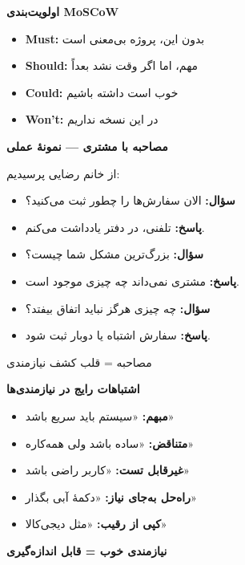 \documentclass[14pt, a4paper, landscape]{extarticle}
\newcommand{\slide}[1]{%
    \newpage
    \begin{center}
    \begin{minipage}[t]{0.95\textwidth}
    \vspace{0.5cm}
    #1
    \vspace{0.5cm}
    \end{minipage}
    \end{center}
}
\newcommand{\slidetitle}[1]{%
    \begin{center}
        {\LARGE\bfseries\textcolor{primary}{#1}}
    \end{center}
    \vspace{0.5cm}
}
\newcommand{\myaccent}[1]{\textcolor{accent}{#1}}
\begin{document}
\slide{
    \slidetitle{اولویت‌بندی MoSCoW}
    \vspace{0.5cm}
    \begin{itemize}[itemsep=0.7em]
        \item \textbf{\textcolor{primary}{Must:}} بدون این، پروژه بی‌معنی است
        \item \textbf{\textcolor{accent}{Should:}} مهم، اما اگر وقت نشد بعداً
        \item \textbf{Could:} خوب است داشته باشیم
        \item \textbf{Won't:} در این نسخه نداریم
    \end{itemize}
}

\slide{
    \slidetitle{مصاحبه با مشتری — نمونهٔ عملی}
    \vspace{0.5cm}
    {\large از خانم رضایی پرسیدیم:}
    \vspace{0.5cm}
    \begin{itemize}[itemsep=0.6em]
        \item {\large\textbf{سؤال:} الان سفارش‌ها را چطور ثبت می‌کنید؟}
        \item {\large\textbf{پاسخ:} تلفنی، در دفتر یادداشت می‌کنم.}
        \vspace{0.3cm}
        \item {\large\textbf{سؤال:} بزرگ‌ترین مشکل شما چیست؟}
        \item {\large\textbf{پاسخ:} مشتری نمی‌داند چه چیزی موجود است.}
        \vspace{0.3cm}
        \item {\large\textbf{سؤال:} چه چیزی هرگز نباید اتفاق بیفتد؟}
        \item {\large\textbf{پاسخ:} سفارش اشتباه یا دوبار ثبت شود.}
    \end{itemize}
    \vspace{0.5cm}
    \begin{center}
        {\myaccent{مصاحبه = قلب کشف نیازمندی}}
    \end{center}
}

\slide{
    \slidetitle{اشتباهات رایج در نیازمندی‌ها}
    \vspace{0.5cm}
    \begin{itemize}[itemsep=0.6em]
        \item {\large\textbf{مبهم:} «سیستم باید سریع باشد»}
        \item {\large\textbf{متناقض:} «ساده باشد ولی همه‌کاره»}
        \item {\large\textbf{غیرقابل تست:} «کاربر راضی باشد»}
        \item {\large\textbf{راه‌حل به‌جای نیاز:} «دکمهٔ آبی بگذار»}
        \item {\large\textbf{کپی از رقیب:} «مثل دیجی‌کالا»}
    \end{itemize}
    \vspace{1cm}
    \begin{center}
        {\large\bfseries\myaccent{نیازمندی خوب = قابل اندازه‌گیری}}
    \end{center}
}
\end{document}
